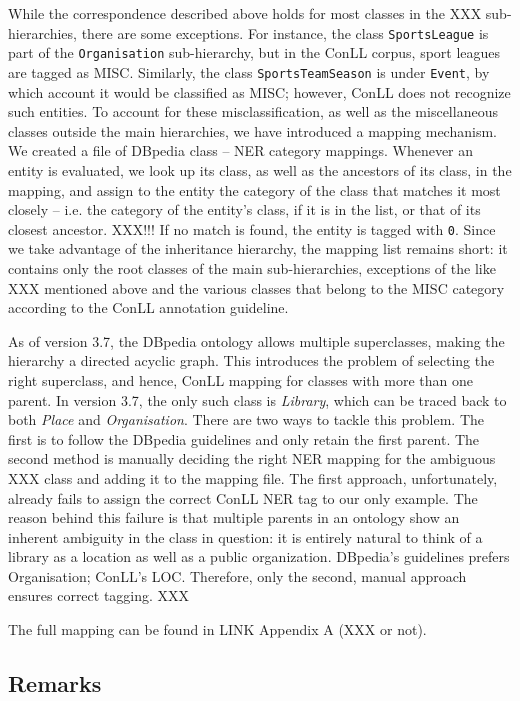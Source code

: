 \documentclass[11pt]{article}
\begin{document}
While the correspondence described above holds for most classes in the XXX sub-hierarchies, there are some exceptions. For instance, the class \texttt{SportsLeague} is part of the \texttt{Organisation} sub-hierarchy, but in the ConLL corpus, sport leagues are tagged as MISC. Similarly, the class \texttt{SportsTeamSeason} is under \texttt{Event}, by which account it would be classified as MISC; however, ConLL does not recognize such entities. To account for these misclassification, as well as the miscellaneous classes outside the main hierarchies, we have introduced a mapping mechanism. We created a file of DBpedia class -- NER category mappings. Whenever an entity is evaluated, we look up its class, as well as the ancestors of its class, in the mapping, and assign to the entity the category of the class that matches it most closely -- i.e. the category of the entity's class, if it is in the list, or that of its closest ancestor. XXX!!! If no match is found, the entity is tagged with \texttt{0}. Since we take advantage of the inheritance hierarchy, the mapping list remains short: it contains only the root classes of the main sub-hierarchies, exceptions of the like XXX mentioned above and the various classes that belong to the MISC category according to the ConLL annotation guideline.

As of version 3.7, the DBpedia ontology allows multiple superclasses, making the hierarchy a directed acyclic graph. This introduces the problem of selecting the right superclass, and hence, ConLL mapping for classes with more than one parent. In version 3.7, the only such class is \textit{Library}, which can be traced back to both \textit{Place} and \textit{Organisation}. There are two ways to tackle this problem. The first is to follow the DBpedia guidelines and only retain the first parent. The second method is manually deciding the right NER mapping for the ambiguous XXX class and adding it to the mapping file. The first approach, unfortunately, already fails to assign the correct ConLL NER tag to our only example. The reason behind this failure is that multiple parents in an ontology show an inherent ambiguity in the class in question: it is entirely natural to think of a library as a location as well as a public organization. DBpedia's guidelines prefers Organisation; ConLL's LOC. Therefore, only the second, manual approach ensures correct tagging. XXX

The full mapping can be found in LINK Appendix A (XXX or not).

\subsection{Remarks}
\end{document}
